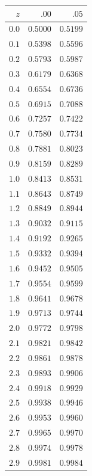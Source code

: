 \documentclass[
  10pt,
  twoside]{book}
\newcounter{none} %
\begin{document}
{\def\LTcaptype{none} %
\begin{table}[H]
\centering
\begin{tabular}{|r|r|r|}
\toprule
\(z\) & \(.00\) & \(.05\) \\
\midrule



\(0.0\) & \(0.5000\) & \(0.5199\) \\
\(0.1\) & \(0.5398\) & \(0.5596\) \\
\(0.2\) & \(0.5793\) & \(0.5987\) \\
\(0.3\) & \(0.6179\) & \(0.6368\) \\
\(0.4\) & \(0.6554\) & \(0.6736\) \\
\(0.5\) & \(0.6915\) & \(0.7088\) \\
\(0.6\) & \(0.7257\) & \(0.7422\) \\
\(0.7\) & \(0.7580\) & \(0.7734\) \\
\(0.8\) & \(0.7881\) & \(0.8023\) \\
\(0.9\) & \(0.8159\) & \(0.8289\) \\
\(1.0\) & \(0.8413\) & \(0.8531\) \\
\(1.1\) & \(0.8643\) & \(0.8749\) \\
\(1.2\) & \(0.8849\) & \(0.8944\) \\
\(1.3\) & \(0.9032\) & \(0.9115\) \\
\(1.4\) & \(0.9192\) & \(0.9265\) \\
\(1.5\) & \(0.9332\) & \(0.9394\) \\
\(1.6\) & \(0.9452\) & \(0.9505\) \\
\(1.7\) & \(0.9554\) & \(0.9599\) \\
\(1.8\) & \(0.9641\) & \(0.9678\) \\
\(1.9\) & \(0.9713\) & \(0.9744\) \\
\(2.0\) & \(0.9772\) & \(0.9798\) \\
\(2.1\) & \(0.9821\) & \(0.9842\) \\
\(2.2\) & \(0.9861\) & \(0.9878\) \\
\(2.3\) & \(0.9893\) & \(0.9906\) \\
\(2.4\) & \(0.9918\) & \(0.9929\) \\
\(2.5\) & \(0.9938\) & \(0.9946\) \\
\(2.6\) & \(0.9953\) & \(0.9960\) \\
\(2.7\) & \(0.9965\) & \(0.9970\) \\
\(2.8\) & \(0.9974\) & \(0.9978\) \\
\(2.9\) & \(0.9981\) & \(0.9984\) \\
\bottomrule
\end{tabular}
\end{table}
}
\end{document}

